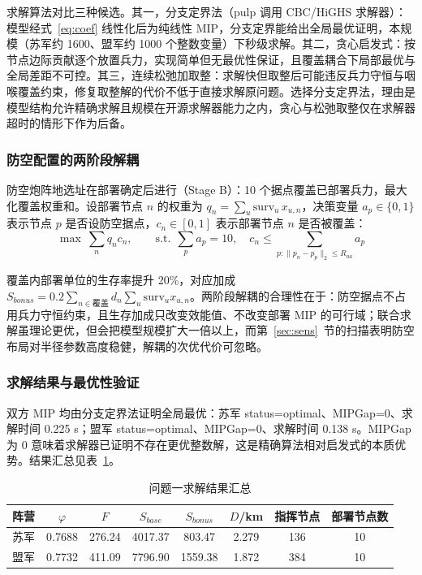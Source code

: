 \documentclass[12pt,a4paper]{ctexart}
\begin{document}
求解算法对比三种候选\cite{ref2}。其一，分支定界法（pulp 调用 CBC/HiGHS 求解器）：模型经式~\eqref{eq:coef} 线性化后为纯线性 MIP，分支定界能给出全局最优证明，本规模（苏军约 1600、盟军约 1000 个整数变量）下秒级求解。其二，贪心启发式：按节点边际贡献逐个放置兵力，实现简单但无最优性保证，且覆盖耦合下局部最优与全局差距不可控。其三，连续松弛加取整：求解快但取整后可能违反兵力守恒与咽喉覆盖约束，修复取整解的代价不低于直接求解原问题。选择分支定界法，理由是模型结构允许精确求解且规模在开源求解器能力之内，贪心与松弛取整仅在求解器超时的情形下作为后备。

\subsubsection{防空配置的两阶段解耦}

防空炮阵地选址在部署确定后进行（Stage B）：10 个据点覆盖已部署兵力，最大化覆盖权重和。设部署节点 $n$ 的权重为 $q_n=\sum_u \mathrm{surv}_u\,x_{u,n}$，决策变量 $a_p\in\{0,1\}$ 表示节点 $p$ 是否设防空据点，$c_n\in[0,1]$ 表示部署节点 $n$ 是否被覆盖：
\begin{equation}
\max\ \sum_n q_n c_n,\qquad \text{s.t.}\ \ \sum_p a_p=10,\quad c_n\le\sum_{p:\|p_n-p_p\|_2\le R_{aa}}a_p
\label{eq:aa}
\end{equation}
\begin{sloppypar}
覆盖内部署单位的生存率提升 20\%，对应加成 $S_{bonus}=0.2\sum_{n\in\text{覆盖}}d_n\sum_u\mathrm{surv}_u x_{u,n}$。两阶段解耦的合理性在于：防空据点不占用兵力守恒约束，且生存加成只改变效能值、不改变部署 MIP 的可行域；联合求解虽理论更优，但会把模型规模扩大一倍以上，而第~\ref{sec:sens}~节的扫描表明防空布局对半径参数高度稳健，解耦的次优代价可忽略。
\end{sloppypar}

\subsubsection{求解结果与最优性验证}

双方 MIP 均由分支定界法证明全局最优：苏军 status=optimal、MIPGap=0、求解时间 0.225 s；盟军 status=optimal、MIPGap=0、求解时间 0.138 s。MIPGap 为 0 意味着求解器已证明不存在更优整数解，这是精确算法相对启发式的本质优势。结果汇总见表~\ref{tab:q1res}。

\begin{table}[H]
\centering
\caption{问题一求解结果汇总}
\label{tab:q1res}
\begin{tabular}{lccccccc}
\toprule
阵营 & $\varphi$ & $F$ & $S_{base}$ & $S_{bonus}$ & $D$/km & 指挥节点 & 部署节点数 \\
\midrule
苏军 & 0.7688 & 276.24 & 4017.37 & 803.47 & 2.279 & 136 & 10 \\
盟军 & 0.7732 & 411.09 & 7796.90 & 1559.38 & 1.872 & 384 & 10 \\
\bottomrule
\end{tabular}
\end{table}
\end{document}
